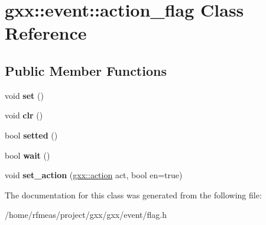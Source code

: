 \hypertarget{classgxx_1_1event_1_1action__flag}{}\section{gxx\+:\+:event\+:\+:action\+\_\+flag Class Reference}
\label{classgxx_1_1event_1_1action__flag}
\subsection*{Public Member Functions}
\begin{DoxyCompactItemize}
\item 
void {\bfseries set} ()\hypertarget{classgxx_1_1event_1_1action__flag_aa4ec88cebf7fc7bade079717fe27128b}{}\label{classgxx_1_1event_1_1action__flag_aa4ec88cebf7fc7bade079717fe27128b}

\item 
void {\bfseries clr} ()\hypertarget{classgxx_1_1event_1_1action__flag_afd30e58f43b2e38ed09a791cd62860c3}{}\label{classgxx_1_1event_1_1action__flag_afd30e58f43b2e38ed09a791cd62860c3}

\item 
bool {\bfseries setted} ()\hypertarget{classgxx_1_1event_1_1action__flag_aeab261548b9607ebb75c303d46e1a96f}{}\label{classgxx_1_1event_1_1action__flag_aeab261548b9607ebb75c303d46e1a96f}

\item 
bool {\bfseries wait} ()\hypertarget{classgxx_1_1event_1_1action__flag_a592def27764deecd795a949e203cba0c}{}\label{classgxx_1_1event_1_1action__flag_a592def27764deecd795a949e203cba0c}

\item 
void {\bfseries set\+\_\+action} (\hyperlink{classgxx_1_1delegate}{gxx\+::action} act, bool en=true)\hypertarget{classgxx_1_1event_1_1action__flag_abc9fab0876b797d229c3a4c3f26d2d7a}{}\label{classgxx_1_1event_1_1action__flag_abc9fab0876b797d229c3a4c3f26d2d7a}

\end{DoxyCompactItemize}


The documentation for this class was generated from the following file\+:\begin{DoxyCompactItemize}
\item 
/home/rfmeas/project/gxx/gxx/event/flag.\+h\end{DoxyCompactItemize}
